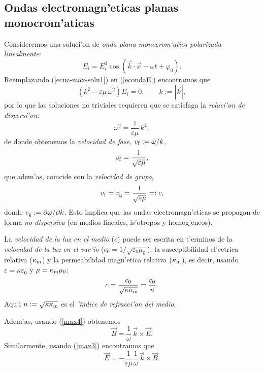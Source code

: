 \subsection{Ondas electromagn'eticas planas monocrom'aticas}
Consideremos una soluci'on de \textit{onda plana monocrom'atica polarizada linealmente}:
\begin{equation}
E_i=E_i^0 \cos\left(\vec{k}\cdot\vec{x}-\omega t+\varphi_0\right)
.\label{ecuc-max-solu1}%
\end{equation}
Reemplazando (\ref{ecuc-max-solu1}) en (\ref{econdaE}) encontramos que%
\begin{equation}
\left(k^2-\varepsilon\mu\,\omega^2\right)  E_i=0, \qquad k:=|\vec{k}|,
\end{equation}
por lo que las soluciones no triviales requieren que se satisfaga la
\textit{relaci'on de dispersi'on}:
\begin{equation}
\omega^2=\frac{1}{\varepsilon\mu}\,k^2, \label{rdoem}
\end{equation}
de donde obtenemos la \textit{velocidad de fase},
$v_{\rm f}:=\omega/k$,
\begin{equation}
v_{\rm f}=\frac{1}{\sqrt{\varepsilon\mu}},
\end{equation}
que adem'as, coincide con la \textit{velocidad de grupo}, 
\begin{equation}
v_{\rm f}=v_{\rm g}=\frac{1}{\sqrt{\varepsilon\mu}}=:c,
\end{equation}
donde $v_{\rm g}:=\partial\omega/\partial k$. Esto implica que las ondas electromagn'eticas se propagan de forma \textit{no-dispersiva} (en medios lineales, is'otropos y homog'eneos). 

La \textit{velocidad de la luz en el medio} ($c$) puede ser escrita en t'erminos de la \textit{velocidad de la luz en el vac'io} ($c_0=1/\sqrt{\varepsilon_0\mu_0}$), la susceptibilidad el'ectrica relativa ($\kappa_{\rm m}$) y la permeabilidad magn'etica relativa ($\kappa_{\rm m}$), es decir, usando $\varepsilon=\kappa\varepsilon_0$ y $\mu=\kappa_{\rm m}\mu_0$:
\begin{equation}
c=\frac{c_0}{\sqrt{\kappa\kappa_{\rm m}}}=\frac{c_0}{n}.
\end{equation}
Aqu'i $n:=\sqrt{\kappa\kappa_{\rm m}}$ es el \textit{'indice de refracci'on del medio}.

Adem'as, usando (\ref{max4}) obtenemos
\begin{equation}\label{BkE}
 \vec{B}=\frac{1}{\omega}\,\vec{k}\times\vec{E}.
\end{equation}
Similarmente, usando (\ref{max3}) encontramos que
\begin{equation}
 \vec{E}=-\frac{1}{\varepsilon\mu}\frac{1}{\omega}\,\vec{k}\times\vec{B}.
\end{equation}


